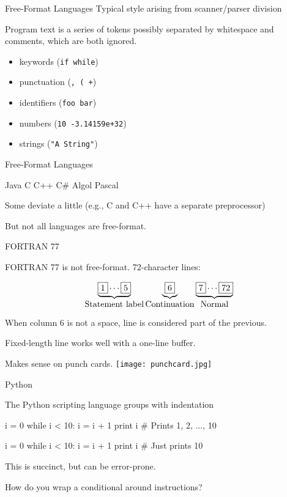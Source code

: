 \documentclass{plt}
\begin{document}
\begin{frame}{Free-Format Languages}
Typical style arising from scanner/parser division

Program text is a series of tokens possibly separated by whitespace
and comments, which are both ignored.

\begin{itemize}
\item keywords (\texttt{if while})
\item punctuation (\texttt{, ( +})
\item identifiers (\texttt{foo bar})
\item numbers (\texttt{10 -3.14159e+32})
\item strings (\texttt{"A String"})
\end{itemize}

\end{frame}

\begin{frame}{Free-Format Languages}

Java \hfil C \hfil C++ \hfil C\# \hfil Algol \hfil Pascal

Some deviate a little (e.g., C and C++ have a separate preprocessor)

But not all languages are free-format.
\end{frame}

\begin{frame}[fragile]{FORTRAN 77}

FORTRAN 77 is not free-format.  72-character lines:



{
\[\underbrace{\framebox{\textrm{1}} \cdots \framebox{\textrm{5}}}_{\mbox{Statement label}}
\underbrace{\framebox{\textrm{6}}}_{\mbox{Continuation}}
\underbrace{\framebox{\textrm{7}} \cdots \framebox{\textrm{72}}}_{\mbox{Normal}}\]
}

When column 6 is not a space, line is considered part of the
previous.

Fixed-length line works well with a one-line buffer.

Makes sense on punch cards. \texttt{[image: punchcard.jpg]}

\end{frame}

\begin{frame}[fragile]{Python}

The Python scripting language groups with indentation

\begin{python}
i = 0
while i < 10:
    i = i + 1
    print i    # Prints 1, 2, ..., 10

i = 0
while i < 10:
    i = i + 1
print i        # Just prints 10
\end{python}

This is succinct, but can be error-prone.

How do you wrap a conditional around instructions?

\end{frame}
\end{document}
